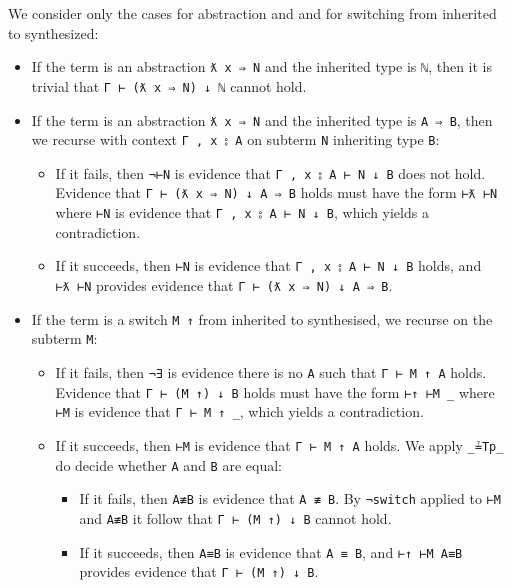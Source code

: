 We consider only the cases for abstraction and and for switching from
inherited to synthesized:

\begin{itemize}
\item
  If the term is an abstraction \texttt{ƛ\ x\ ⇒\ N} and the inherited
  type is \texttt{\textasciigrave{}ℕ}, then it is trivial that
  \texttt{Γ\ ⊢\ (ƛ\ x\ ⇒\ N)\ ↓\ \textasciigrave{}ℕ} cannot hold.
\item
  If the term is an abstraction \texttt{ƛ\ x\ ⇒\ N} and the inherited
  type is \texttt{A\ ⇒\ B}, then we recurse with context
  \texttt{Γ\ ,\ x\ ⦂\ A} on subterm \texttt{N} inheriting type
  \texttt{B}:

  \begin{itemize}
  \item
    If it fails, then \texttt{¬⊢N} is evidence that
    \texttt{Γ\ ,\ x\ ⦂\ A\ ⊢\ N\ ↓\ B} does not hold. Evidence that
    \texttt{Γ\ ⊢\ (ƛ\ x\ ⇒\ N)\ ↓\ A\ ⇒\ B} holds must have the form
    \texttt{⊢ƛ\ ⊢N} where \texttt{⊢N} is evidence that
    \texttt{Γ\ ,\ x\ ⦂\ A\ ⊢\ N\ ↓\ B}, which yields a contradiction.
  \item
    If it succeeds, then \texttt{⊢N} is evidence that
    \texttt{Γ\ ,\ x\ ⦂\ A\ ⊢\ N\ ↓\ B} holds, and \texttt{⊢ƛ\ ⊢N}
    provides evidence that \texttt{Γ\ ⊢\ (ƛ\ x\ ⇒\ N)\ ↓\ A\ ⇒\ B}.
  \end{itemize}
\item
  If the term is a switch \texttt{M\ ↑} from inherited to synthesised,
  we recurse on the subterm \texttt{M}:

  \begin{itemize}
  \item
    If it fails, then \texttt{¬∃} is evidence there is no \texttt{A}
    such that \texttt{Γ\ ⊢\ M\ ↑\ A} holds. Evidence that
    \texttt{Γ\ ⊢\ (M\ ↑)\ ↓\ B} holds must have the form
    \texttt{⊢↑\ ⊢M\ \_} where \texttt{⊢M} is evidence that
    \texttt{Γ\ ⊢\ M\ ↑\ \_}, which yields a contradiction.
  \item
    If it succeeds, then \texttt{⊢M} is evidence that
    \texttt{Γ\ ⊢\ M\ ↑\ A} holds. We apply \texttt{\_≟Tp\_} do decide
    whether \texttt{A} and \texttt{B} are equal:

    \begin{itemize}
    \item
      If it fails, then \texttt{A≢B} is evidence that \texttt{A\ ≢\ B}.
      By \texttt{¬switch} applied to \texttt{⊢M} and \texttt{A≢B} it
      follow that \texttt{Γ\ ⊢\ (M\ ↑)\ ↓\ B} cannot hold.
    \item
      If it succeeds, then \texttt{A≡B} is evidence that
      \texttt{A\ ≡\ B}, and \texttt{⊢↑\ ⊢M\ A≡B} provides evidence that
      \texttt{Γ\ ⊢\ (M\ ↑)\ ↓\ B}.
    \end{itemize}
  \end{itemize}
\end{itemize}

